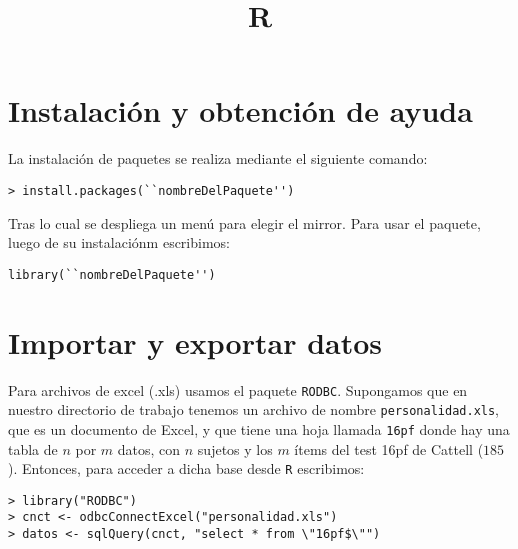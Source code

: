 \documentclass[12pt,a4paper]{article}
\title{R}
\begin{document}
\maketitle

\section{Instalaci\'on y obtenci\'on de ayuda}
La instalaci\'on de paquetes se realiza mediante el siguiente comando:
\begin{verbatim}
> install.packages(``nombreDelPaquete'')
\end{verbatim}
Tras lo cual se despliega un men\'u para elegir el mirror.
Para usar el paquete, luego de su instalaci\'onm escribimos:
\begin{verbatim}
library(``nombreDelPaquete'')
\end{verbatim}

\section{Importar y exportar datos}
Para archivos de excel (.xls) usamos el paquete \texttt{RODBC}.
Supongamos que en nuestro directorio de trabajo tenemos un archivo
de nombre \texttt{personalidad.xls}, que es un documento de Excel, y
que tiene una hoja llamada \texttt{16pf} donde hay una tabla de \(n\)
por \(m\) datos, con \(n\) sujetos y los \(m\) \'items del test 16pf de
Cattell (\(185\)). Entonces, para acceder a dicha base desde
\texttt{R} escribimos:
\begin{verbatim}
> library("RODBC")
> cnct <- odbcConnectExcel("personalidad.xls")
> datos <- sqlQuery(cnct, "select * from \"16pf$\"")
\end{verbatim}
\end{document}
